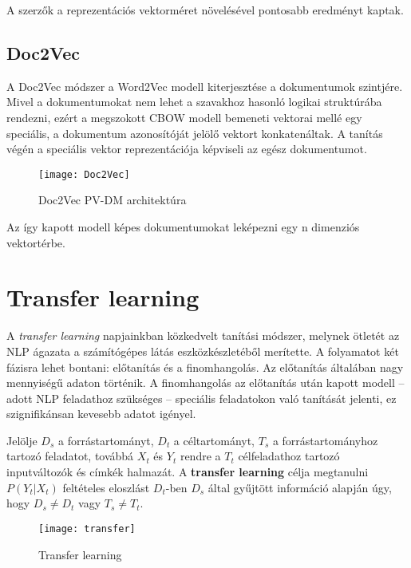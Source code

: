 \begin{note}
	A szerzők a reprezentációs vektorméret növelésével pontosabb eredményt kaptak.
\end{note}

\subsection{Doc2Vec}
A Doc2Vec módszer a Word2Vec modell kiterjesztése a dokumentumok szintjére. Mivel a dokumentumokat nem lehet a szavakhoz hasonló logikai struktúrába rendezni, ezért a megszokott CBOW modell bemeneti vektorai mellé egy speciális, a dokumentum azonosítóját jelölő vektort konkatenáltak. A tanítás végén a speciális vektor reprezentációja képviseli az egész dokumentumot.

\begin{figure}[H]
	\centering
	\texttt{[image: Doc2Vec]}
	\caption{Doc2Vec PV-DM architektúra}
\end{figure}

Az így kapott modell képes dokumentumokat leképezni egy n dimenziós vektortérbe.

\section{Transfer learning}

A \textit{transfer learning} napjainkban közkedvelt tanítási módszer, melynek ötletét az NLP ágazata a számítógépes látás eszközkészletéből merítette. A folyamatot két fázisra lehet bontani: előtanítás és a finomhangolás. Az előtanítás általában nagy mennyiségű adaton történik. A finomhangolás az előtanítás után kapott modell – adott NLP feladathoz szükséges – speciális feladatokon való tanítását jelenti, ez szignifikánsan kevesebb adatot igényel.

\begin{definition}
	Jelölje $D_s$ a forrástartományt, $D_t$ a céltartományt, $T_s$ a forrástartományhoz tartozó feladatot, továbbá $X_t$ és $Y_t$ rendre a $T_t$ célfeladathoz tartozó inputváltozók és  címkék halmazát. A \textbf{transfer learning} célja megtanulni $P(Y_t|X_t)$ feltételes eloszlást $D_t$-ben $D_s$ által gyűjtött információ alapján úgy, hogy $D_s \neq D_t$ vagy $T_s \neq T_t$.	 
\end{definition}

\begin{figure}[H]
	\centering
	\texttt{[image: transfer]}
	\caption{Transfer learning}
\end{figure}







